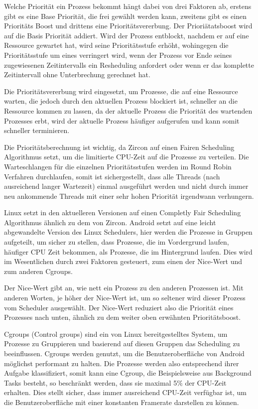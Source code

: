 \documentclass[a4paper]{scrartcl}
\begin{document}
Welche Priorität ein Prozess bekommt hängt dabei von drei Faktoren ab, erstens gibt es eine Base Priorität, die frei gewählt werden kann, zweitens gibt es einen Prioritäts Boost und drittens eine Prioritätsvererbung. Der Prioriätatsboost wird auf die Basis Priorität addiert. Wird der Prozess entblockt, nachdem er auf eine Ressource gewartet hat, wird seine Prioritätsstufe erhöht, wohingegen die Prioritätsstufe um eines verringert wird, wenn der Prozess vor Ende seines zugewiesenen Zeitintervalls ein Resheduling anfordert oder wenn er das komplette Zeitintervall ohne Unterbrechung gerechnet hat. \cite{Fuchsia.Zircon.Scheduling}

Die Prioritätsvererbung wird eingesetzt, um Prozesse, die auf eine Ressource warten, die jedoch durch den aktuellen Prozess blockiert ist, schneller an die Ressource kommen zu lassen, da der aktuelle Prozess die Priorität des wartenden Prozesses erbt, wird der aktuelle Prozess häufiger aufgerufen und kann somit schneller terminieren. \cite{Fuchsia.Zircon.Scheduling}

Die Prioritätsberechnung ist wichtig, da Zircon auf einen Fairen Scheduling Algorithmus setzt, um die limitierte CPU-Zeit auf die Prozesse zu verteilen. Die Warteschlangen für die einzelnen Prioritätsstufen werden im Round Robin Verfahren durchlaufen, somit ist sichergestellt, dass alle Threads (nach ausreichend langer Wartezeit) einmal ausgeführt werden und nicht durch immer neu ankommende Threads mit einer sehr hohen Priorität irgendwann verhungern. \cite{Fuchsia.Zircon.FairScheduler}

Linux setzt in den aktuelleren Versionen auf einen Completly Fair Scheduling Algorithmus ähnlich zu dem von Zircon. Android setzt auf eine leicht abgewandelte Version des Linux Schedulers, hier werden die Prozesse in Gruppen aufgeteilt, um sicher zu stellen, dass Prozesse, die im Vordergrund laufen, häufiger CPU Zeit bekommen, als Prozesse, die im Hintergrund laufen. Dies wird im Wesentlichen durch zwei Faktoren gesteuert, zum einen der Nice-Wert und zum anderen Cgroups. \cite{Android.Process.Scheduler}

Der Nice-Wert gibt an, wie nett ein Prozess zu den anderen Prozessen ist. Mit anderen Worten, je höher der Nice-Wert ist, um so seltener wird dieser Prozess vom Scheduler ausgewählt. Der Nice-Wert reduziert also die Priorität eines Prozesses nach unten, ähnlich zu dem weiter oben erwähnten Prioritätsboost. \cite{Android.Process.Nice}

Cgroups (Control groups) sind ein von Linux bereitgestelltes System, um Prozesse zu Gruppieren und basierend auf diesen Gruppen das Scheduling zu beeinflussen. Cgroups werden genutzt, um die Benutzeroberfläche von Android möglichst performant zu halten. Die Prozesse werden also entsprechend ihrer Aufgabe klassifiziert, somit kann eine Cgroup, die Beispielsweise aus Background Tasks besteht, so beschränkt werden, dass sie maximal 5\% der CPU-Zeit erhalten. Dies stellt sicher, dass immer ausreichend CPU-Zeit verfügbar ist, um die Benutzeroberfläche mit einer konstanten Framerate darstellen zu können. \cite{Android.Process.Cgroup}
\end{document}
